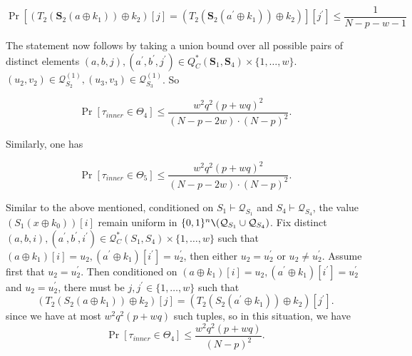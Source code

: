 $$
\operatorname{Pr}\left[\left(T_{2}\left(\mathbf{S}_{2}\left(a \oplus k_{1}\right)\right) \oplus k_{2}\right)[j]=\left(T_{2}\left(\mathbf{S}_{2}\left(a^{\prime} \oplus k_{1}\right)\right) \oplus k_{2}\right)\right][j^{\prime}] \leq \frac{1}{N -p -w -1}
$$

The statement now follows by taking a union bound over all possible pairs of distinct elements $(a,b,j),(a^{\prime},b^{\prime},j^{\prime}) \in Q_{C}^{*}\left(\mathbf{S}_{1},\mathbf{S}_{4}\right) \times \{1, \ldots, w\}$.$(u_{2},v_{2}) \in \mathcal{Q}_{S_{2}}^{(1)},(u_{3},v_{3}) \in \mathcal{Q}_{S_{3}}^{(1)}$. So

$$
\operatorname{Pr}\left[\tau_{inner} \in \Theta_{4}\right] \leq \frac{w^{2} q^{2} (p+w q)^{2}}{(N -p -2 w) \cdot (N-p)^{2}}.
$$

\noindent Similarly, one has

$$
\operatorname{Pr}\left[\tau_{inner} \in \Theta_{5}\right] \leq \frac{w^{2} q^{2} (p+w q)^{2}}{(N -p -2 w) \cdot (N-p)^{2}}.
$$



Similar to the above mentioned, conditioned on $S_{1} \vdash \mathcal{Q}_{S_{1}}$ and $S_{4} \vdash \mathcal{Q}_{S_{4}}$, the value $\left(S_{1}\left(x \oplus k_{0}\right)\right)[i]$ remain uniform in $\{0, 1\}^{n} \verb|\| (\mathcal{Q}_{S_{1}} \cup \mathcal{Q}_{S_{4}})$. Fix distinct $(a,b,i),(a^{\prime},b^{\prime},i^{\prime}) \in \mathcal{Q}_{C}^{*}\left(S_{1},S_{4}\right) \times \{1, \ldots, w\}$ such that $\left(a \oplus k_{1}\right)[i] = u_2, \left(a^{\prime} \oplus k_{1}\right)[i^{\prime}] = u_2^{\prime}$, then either $u_2 = u_2^{\prime}$ or $u_2 \neq u_2^{\prime}$. Assume first that $u_2 = u_2^{\prime}$. Then conditioned on $\left(a \oplus k_{1}\right)[i] = u_2, \left(a^{\prime} \oplus k_{1}\right)[i^{\prime}] = u_2^{\prime}$ and $u_2 = u_2^{\prime}$, there must be $j, j^{\prime} \in\{1, \ldots, w\}$ such that
$$
\left(T_{2}\left(S_{2}\left(a \oplus k_{1}\right)\right) \oplus k_{2}\right)[j] = \left(T_{2}\left(S_{2}\left(a^{\prime} \oplus k_{1}\right)\right) \oplus k_{2}\right)[j^{\prime}].
$$
since we have at most $w^2 q^2 (p+w q)$ such tuples, so in this situation, we have
$$
\operatorname{Pr}\left[\tau_{inner} \in \Theta_{4}\right] \leq \frac{w^{2} q^2 (p+w q)}{(N-p)^2}.
$$

